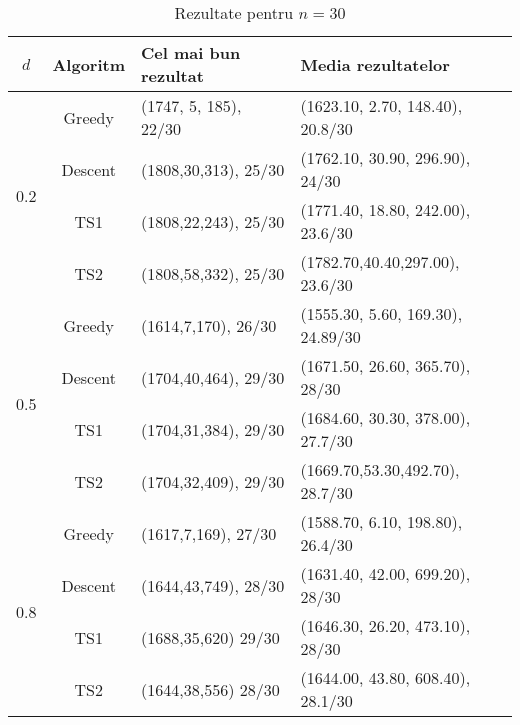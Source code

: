 \begin{table}[H]
\centering
\caption{Rezultate pentru $n = 30$}
\begin{tabular}{ccll}
\toprule
$d$ & Algoritm & Cel mai bun rezultat  & Media rezultatelor \\
\midrule
\multirow{4}{*}{0.2}
  & Greedy  & (1747, 5, 185), 22/30 & (1623.10, 2.70, 148.40), 20.8/30 \\
  & Descent & (1808,30,313), 25/30   & (1762.10, 30.90, 296.90), 24/30 \\
  & TS1     & (1808,22,243), 25/30    & (1771.40, 18.80, 242.00), 23.6/30 \\
  & TS2     & (1808,58,332), 25/30    & (1782.70,40.40,297.00), 23.6/30 \\
\midrule
\multirow{4}{*}{0.5}
  & Greedy  & (1614,7,170), 26/30     & (1555.30, 5.60, 169.30), 24.89/30 \\
  & Descent & (1704,40,464), 29/30    & (1671.50, 26.60, 365.70), 28/30 \\
  & TS1     & (1704,31,384), 29/30    & (1684.60, 30.30, 378.00),
  27.7/30 \\
  & TS2     & (1704,32,409), 29/30    & (1669.70,53.30,492.70), 28.7/30 \\
\midrule
\multirow{4}{*}{0.8}
  & Greedy  & (1617,7,169), 27/30     & (1588.70, 6.10, 198.80), 26.4/30 \\
  & Descent & (1644,43,749), 28/30    & (1631.40, 42.00, 699.20), 28/30 \\
  & TS1     & (1688,35,620) 29/30     &  (1646.30, 26.20, 473.10), 28/30 \\
  & TS2     &  (1644,38,556) 28/30    &  (1644.00, 43.80, 608.40), 28.1/30 \\
\bottomrule
\end{tabular}\label{tab:rezultate_n30}
\end{table}

